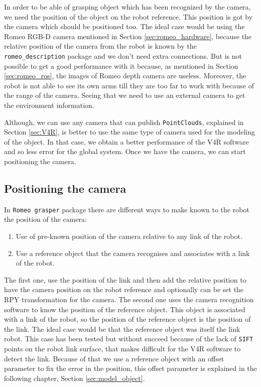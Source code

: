 \documentclass[12pt,a4paper,final,twoside,openright]{report}
\begin{document}
In order to be able of grasping object which has been recognized by the camera, we need the position of the object on the robot reference. This position is got by the camera which should be positioned too. The ideal case would be using the Romeo RGB-D camera mentioned in Section \ref{sec:romeo_hardware}, because the relative position of the camera from the robot is known by the \texttt{romeo\_description} package and we don't need extra connections. But is not possible to get a good performance with it because, as mentioned in Section \ref{sec:romeo_ros}, the images of Romeo depth camera are useless. Moreover, the robot is not able to see its own arms till they are too far to work with because of the range of the camera. Seeing that we need to use an external camera to get the environment information.

Although, we can use any camera that can publish \texttt{PointClouds}, explained in Section \ref{sec:V4R}, is better to use the same type of camera used for the modeling of the object. In that case, we obtain a better performance of the V4R software and so less error for the global system. Once we have the camera, we can start positioning the camera.

\vspace{-10pt}
\subsection{Positioning the camera}
\label{sec:positioning_camera}

In \texttt{Romeo grasper} package there are different ways to make known to the robot the position of the camera:
\begin{enumerate}
\item Use of pre-known position of the camera relative to any link of the robot.
\item Use a reference object that the camera recognises and associates with a link of the robot.
\end{enumerate}

The first one, use the position of the link and then add the relative position to have the camera position on the robot reference and optionally can be set the RPY transformation for the camera. The second one uses the camera recognition software to know the position of the reference object. This object is associated with a link of the robot, so the position of the reference object is the position of the link. The ideal case would be that the reference object was itself the link robot. This case has been tested but without succeed because of the lack of \texttt{SIFT} points on the robot link surface, that makes difficult for the V4R software to detect the link. Because of that we use a reference object with an offset parameter to fix the error in the position, this offset parameter is explained in the following chapter, Section \ref{sec:model_object}.
\end{document}
